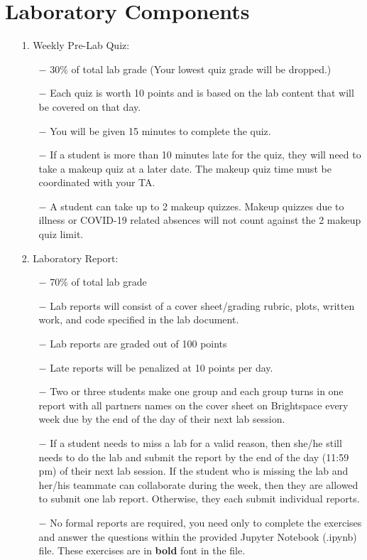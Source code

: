 \documentclass[letterpaper, 11pt]{article}
\begin{document}
\newpage
\section*{Laboratory Components}
\begin{enumerate}
\item[1.] Weekly Pre-Lab Quiz:
\begin{itemize}
\item[$-$] 30\% of total lab grade (Your lowest quiz grade will be dropped.)
\item[$-$] Each quiz is worth 10 points and is based on the lab content that will be covered on that day.
\item[$-$] You will be given 15 minutes to complete the quiz.
\item[$-$] If a student is more than 10 minutes late for the quiz, they will need to take a makeup quiz at a later date. The makeup quiz time must be coordinated with your TA. 
\item[$-$] A student can take up to 2 makeup quizzes. Makeup quizzes due to illness or COVID-19 related absences will not count against the 2 makeup quiz limit.
\end{itemize}
\item[2.] Laboratory Report:
\begin{itemize}
\item[$-$] 70\% of total lab grade
\item[$-$] Lab reports will consist of a cover sheet/grading rubric, plots, written work, and code specified in the lab document.
\item[$-$] Lab reports are graded out of 100 points
\item[$-$] Late reports will be penalized at 10 points per day.
\item[$-$] Two or three students make one group and each group turns in one report with all partners names on the cover sheet on Brightspace every week due by the end of the day of their next lab session.
\item[$-$] If a student needs to miss a lab for a valid reason, then she/he still needs to do the lab and submit the report by the end of the day (11:59 pm) of their next lab session. 
If the student who is missing the lab and her/his teammate can collaborate during the week, then they are allowed to submit one lab report. Otherwise, they each submit individual reports.
\item[$-$] No formal reports are required, you need only to complete the exercises and answer the questions within the provided Jupyter Notebook (.ipynb) file. These exercises are in \textbf{bold} font in the file.

\end{itemize}
\end{enumerate}
\end{document}

